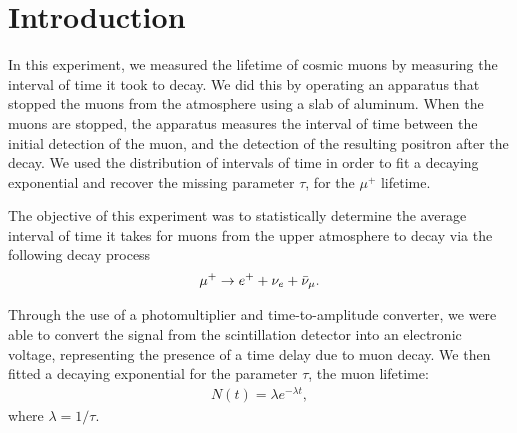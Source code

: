 \section*{Introduction}

In this experiment, we measured the lifetime of cosmic muons by measuring the interval of time it took to decay. We did this by operating an apparatus that stopped the muons from the atmosphere using a slab of aluminum. When the muons are stopped, the apparatus measures the interval of time between the initial detection of the muon, and the detection of the resulting positron after the decay. We used the distribution of intervals of time in order to fit a decaying exponential and recover the missing parameter $\tau$, for the $\mu^{+}$ lifetime. 

The objective of this experiment was to statistically determine the average interval of time it takes for muons from the upper atmosphere to decay via the following decay process
\begin{align}
    \mu^+ \rightarrow e^+ + \nu_e + \Bar{\nu}_\mu.
\end{align}

Through the use of a photomultiplier and time-to-amplitude converter, we were able to convert the signal from the scintillation detector into an electronic voltage, representing the presence of a time delay due to muon decay. We then fitted a decaying exponential for the parameter $\tau$, the muon lifetime:
\begin{align}
    N(t)= \lambda e^{-\lambda t},
\end{align}
where $\lambda = 1 / \tau$.
